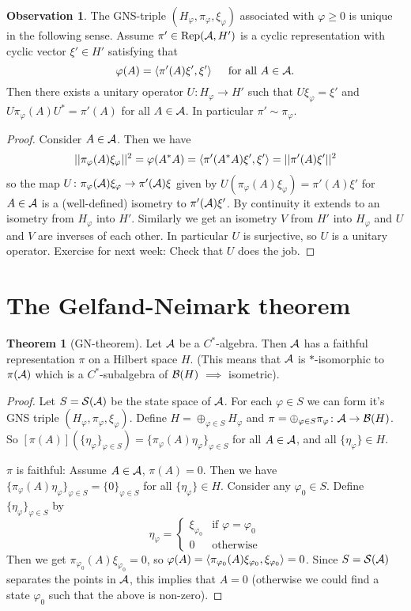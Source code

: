 \documentclass[10pt,english,a4paper]{article}
\theoremstyle{definition}
\newtheorem*{theorem}{Theorem}
\newtheorem*{observation}{Observation}
\def\pivp{\pi_{\vphi}}
\def\Hvp{H_{\vphi}}
\def\xivp{\xi_{\vphi}}
\def\etavp{\eta_{\vphi}}
\DeclareMathOperator{\Rep}{Rep}
\def\vphi{\varphi}
\begin{document}
\begin{observation}
    The GNS-triple $(H_{\vphi}, \pi_{\vphi}, \xi_{\vphi})$ associated with 
$\vphi \geq 0$ is unique in the following sense. Assume $\pi' \in \Rep(\As,H')$ is 
a cyclic representation with cyclic vector $\xi' \in H'$ satisfying that
\[ \vphi(A) = \ind{\pi'(A)\xi',\xi'} \quad \text{ for all } A \in \As.\]
Then there exists a unitary operator $U \colon H_{\vphi}\to H'$ such that  
$U\xi_{\vphi} = \xi'$ and $U\pi_{\vphi}(A)U^* = \pi'(A)$ for all $A \in \mathcal{A}$.
In particular $\pi' \sim \pi_{\vphi}$.
\end{observation}
\begin{proof}
Consider $A \in \mathcal{A}$. Then we have 
\begin{align*}
||\pi_{\vphi}(A)\xi_{\vphi}||^2 = \vphi(A^*A) = \ind{\pi'(A^*A)\xi',\xi'} 
= ||\pi'(A)\xi'||^2  
\end{align*}
so the map
$U\colon \pi_{\vphi}(\As)\xi_{\vphi} \to\pi'(\As)\xi$ given by 
$U(\pi_{\vphi}(A)\xi_{\vphi}) = \pi'(A)\xi'$ for $A \in \mathcal{A}$ is a (well-defined)
isometry to $\pi'(\mathcal{A})\xi'$. By continuity it extends to an isometry from $H_{\vphi}$
into $H'$. Similarly we get an isometry $V$ from $H'$ into $H_{\vphi}$ and $U$
and $V$ are inverses of each other. In particular $U$ is surjective, so $U$
is a unitary operator. Exercise for next week: Check that $U$ does the job. 

\end{proof}

\section*{The Gelfand-Neimark theorem}

\begin{theorem}[GN-theorem]
    Let $\mathcal{A}$ be a $C^*$-algebra. Then $\mathcal{A}$ has a faithful
representation $\pi$ on a Hilbert space $H$. 
(This means that $\mathcal{A}$ is $*$-isomorphic to $\pi(\mathcal{A})$ which is a 
$C^*$-subalgebra of $\mathcal{B}(H)$ $\implies$ isometric).
\end{theorem}
\begin{proof}
    Let $S = \mathcal{S}(\mathcal{A})$ be the state space of $\mathcal{A}$. For each $\vphi \in S$ 
we can form it's GNS triple $(\Hvp, \pivp, \xivp)$. 
Define $H = \oplus_{\vphi \in S} \Hvp$ and $\pi = \oplus_{\vphi \in S} \pi_{\vphi} \colon
\As\to \Bs(H)$. So $[\pi(A)](\{\etavp\}_{\vphi\in S}) = \{ \pivp(A)\etavp\}_{\vphi \in S}$
for all $A \in \mathcal{A}$, and all $\{\etavp\} \in H$.

$\pi$ is faithful: Assume $A\in \mathcal{A}$, $\pi(A) =0$. Then we have 
$\{ \pivp(A)\etavp \}_{\vphi\in S} = \{0\}_{\vphi \in S}$ for all $\{\etavp\}
\in H$. Consider any $\vphi_0 \in S$. Define $\{\etavp\}_{\vphi \in S}$ by
\[ \etavp = \begin{cases} \xi_{\vphi_0} & \text{if } \vphi = \vphi_0 \\
0 & \text{otherwise} \end{cases} \]
Then we get $\pi_{\vphi_0}(A) \xi_{\vphi_0} = 0$, so $\vphi(A) = \ind{\pi_{\vphi_0}(A)\xi_{\vphi_0}, \xi_{\vphi_0}}= 0$.
Since $S = \mathcal{S}(\mathcal{A})$ separates the points in $\mathcal{A}$, this implies that $A=0$ 
(otherwise we could find a state $\vphi_0$ such that the above is non-zero).
\end{proof}
\end{document}
